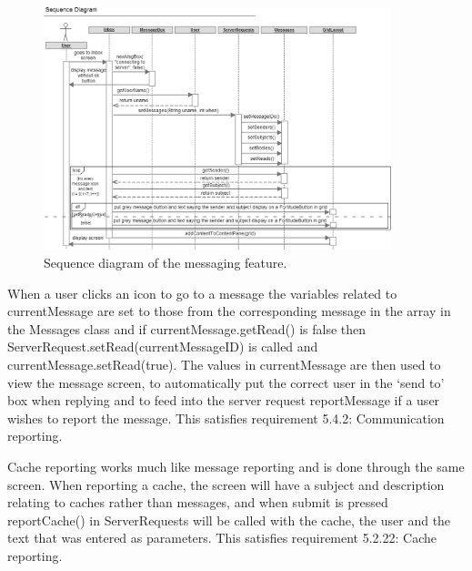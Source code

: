 \begin{figure}
    \centering
    \includegraphics[width=0.9\textwidth]{images/sequence/inbox}
    \caption{Sequence diagram of the messaging feature.}
\end{figure}

When a user clicks an icon to go to a message the variables related to currentMessage are set to those from the corresponding message in the array in the Messages class and if currentMessage.getRead() is false then ServerRequest.setRead(currentMessageID) is called and currentMessage.setRead(true). The values in currentMessage are then used to view the message screen, to automatically put the correct user in the `send to' box when replying and to feed into the server request reportMessage if a user wishes to report the message. This satisfies requirement 5.4.2: Communication reporting.

Cache reporting works much like message reporting and is done through the same screen. When reporting a cache, the screen will have a subject and description relating to caches rather than messages, and when submit is pressed reportCache() in ServerRequests will be called with the cache, the user and the text that was entered as parameters. This satisfies requirement 5.2.22: Cache reporting.

